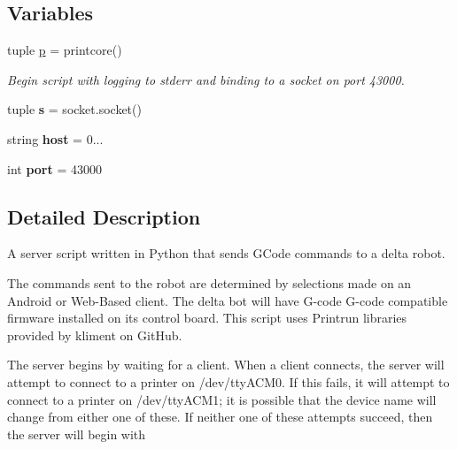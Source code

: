 \subsection*{Variables}
\begin{DoxyCompactItemize}
\item 
tuple \hyperlink{namespacepy_delta_server_a9f57f27f471bef1c4947e6e03b515430}{p} = printcore()
\begin{DoxyCompactList}\small\item\em Begin script with logging to stderr and binding to a socket on port 43000. \end{DoxyCompactList}\item 
\hypertarget{namespacepy_delta_server_a882b3575b268133fed6416e13b268c88}{}tuple {\bfseries s} = socket.\+socket()\label{namespacepy_delta_server_a882b3575b268133fed6416e13b268c88}

\item 
\hypertarget{namespacepy_delta_server_a39fc5b159aee4d88b7c94a9928c6bc82}{}string {\bfseries host} = \textquotesingle{}0...\textquotesingle{}\label{namespacepy_delta_server_a39fc5b159aee4d88b7c94a9928c6bc82}

\item 
\hypertarget{namespacepy_delta_server_ae9b0174d8630e9df876a3507ec25c656}{}int {\bfseries port} = 43000\label{namespacepy_delta_server_ae9b0174d8630e9df876a3507ec25c656}

\end{DoxyCompactItemize}


\subsection{Detailed Description}
A server script written in Python that sends G\+Code commands to a delta robot. 

The commands sent to the robot are determined by selections made on an Android or Web-\/\+Based client. The delta bot will have G-\/code G-\/code compatible firmware installed on its control board. This script uses Printrun libraries provided by kliment on Git\+Hub.

The server begins by waiting for a client. When a client connects, the server will attempt to connect to a printer on /dev/tty\+A\+C\+M0. If this fails, it will attempt to connect to a printer on /dev/tty\+A\+C\+M1; it is possible that the device name will change from either one of these. If neither one of these attempts succeed, then the server will begin with

